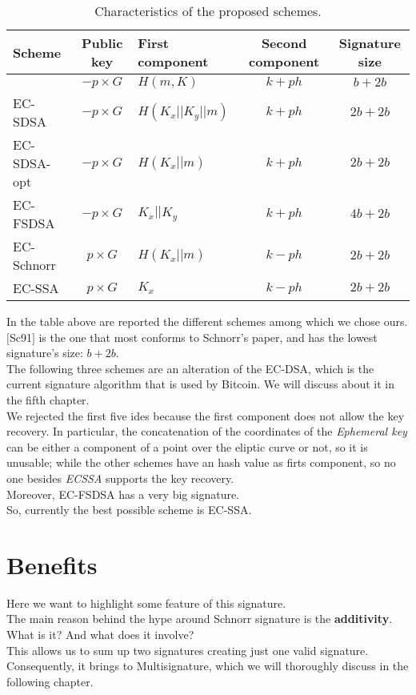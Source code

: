 \begin{table}[H]
	\hspace{-1.8cm}
	\renewcommand{\arraystretch}{2}
	\begin{tabular}{l|clcc}
		\textbf{Scheme} & \textbf{Public key} & \textbf{First component} & \textbf{Second component} & \textbf{Signature size}\\
		\hline
		[Sc91] & $-p \times G$ & $H(m,K)$ & $k+p h$ & $b+2b$\\
		EC-SDSA & $-p \times G$ & $H(K_{x}||K_{y}||m)$ & $k+p h$ & $2b+2b$ \\
		EC-SDSA-opt & $-p \times G$ & $H(K_{x}||m)$ & $k+p h$ & $2b+2b$ \\
		EC-FSDSA & $-p \times G$ & $K_{x}||K_{y}$ & $k+p h$ & $4b+2b$ \\
		EC-Schnorr & $p \times G$ & $H(K_{x}||m)$ & $k-p h$ & $2b+2b$ \\
		\rowcolor{yellow}
		EC-SSA & $p \times G$ & $K_{x}$ & $k-p h$ & $2b+2b$ \\
	\end{tabular}
	\caption{Characteristics of the proposed schemes.}
	\label{tabsig}
\end{table}

In the table above are reported the different schemes among which we chose ours.\\
$[$Sc91$]$ is the one that most conforms to Schnorr's paper, and has the lowest signature's size: $b+2b$.\\
The following three schemes are an alteration of the EC-DSA, which is the current signature algorithm that is used by Bitcoin. We will discuss about it in the fifth chapter.\\
We rejected the first five ides because the first component does not allow the key recovery. In particular, the concatenation of the coordinates of the \textit{Ephemeral key} can be either a component of a point over the eliptic curve or not, so it is unusable; while the other schemes have an hash value as firts component, so no one besides \textit{ECSSA} supports the key recovery.\\
Moreover, EC-FSDSA has a very big signature.\\
So, currently the best possible scheme is EC-SSA.
\section{Benefits}

Here we want to highlight some feature of this signature. \\
The main reason behind the hype around Schnorr signature is the \textbf{additivity}. \\
What is it? And what does it involve?\\
This allows us to sum up two signatures creating just one valid signature.\\
Consequently, it brings to Multisignature, which we will thoroughly discuss in the following chapter.\\

